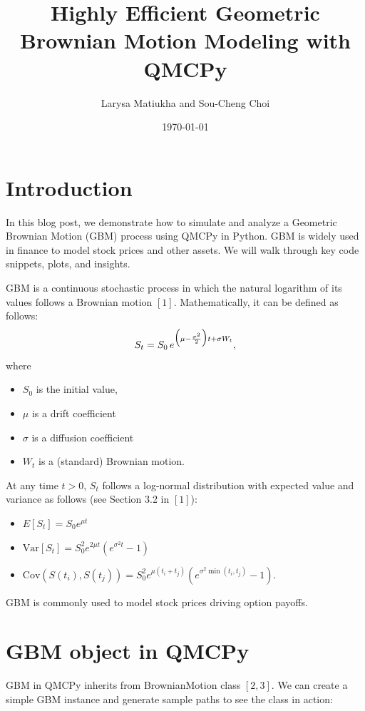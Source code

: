 \documentclass{article}
\title{Highly Efficient Geometric Brownian Motion Modeling with QMCPy}
\author{Larysa Matiukha and Sou-Cheng Choi}
\date{\today}
\begin{document}
\maketitle

\section{Introduction}

In this blog post, we demonstrate how to simulate and analyze a Geometric Brownian Motion (GBM) process using QMCPy in Python.
GBM is widely used in finance to model stock prices and other assets. 
We will walk through key code snippets, plots, and insights.

GBM is a continuous stochastic process in which the natural logarithm of its values follows a Brownian motion $[1]$.
Mathematically, it can be defined as follows:
$$\large{S_t = S_0 \, e^{\big(\mu - \frac{\sigma^2}{2}\big)  t + \sigma W_t}}, \label{gbm}$$
where
\begin{itemize}
\item $S_0$ is the initial value, 
\item $\mu$ is a drift coefficient
\item $\sigma$ is a diffusion coefficient  
\item $W_t$ is a (standard) Brownian motion.
\end{itemize}

At any time $t > 0$, $S_t$ follows a log-normal distribution with expected value and variance as follows (see Section 3.2 in $[1]$):
\begin{itemize}
\item
 $E[S_t] = S_0 e^{\mu t}$
\item $\text{Var}[S_t] = S_0^2 e^{2\mu t}(e^{\sigma^2 t} - 1)$
\item   $  
    \text{Cov}(S(t_i), S(t_j)) = S_0^2 e^{\mu(t_i + t_j)} \left(e^{\sigma^2 \min(t_i, t_j)} - 1\right).$
\end{itemize}

GBM is commonly used to model stock prices driving option payoffs. 

\section{GBM object in QMCPy}

GBM in QMCPy inherits from BrownianMotion class $[2, 3]$. 
We can create a simple GBM instance and generate sample paths to see the class in action:
\end{document}
